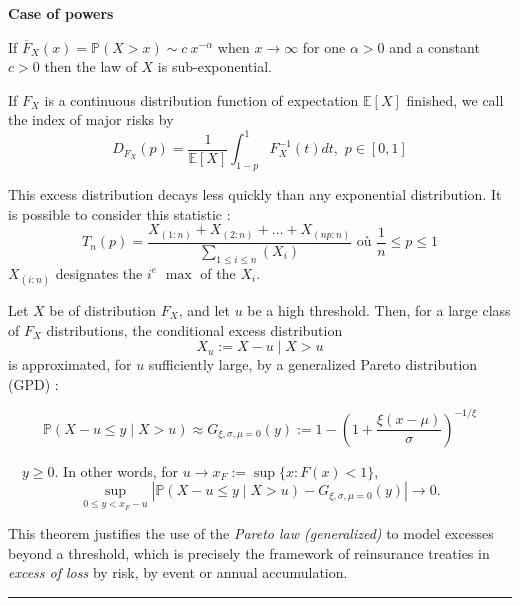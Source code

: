 \begin{f}
	
	\textbf{Case of powers} 
	
	If $\overline{F}_{X}(x)=\mathbb{P}(X > x)\sim c\ x^{-\alpha}$
		when $x \to \infty $ for one $\alpha > 0 $ and a constant $c > 0 $ then the law of $X$
		is sub-exponential.
	
		If $F_X$ is a continuous distribution function of expectation $\mathbb{E}[X]$ finished, we call the index of major risks by
		$$
		D_{F_X}(p)=\frac{1}{\mathbb{E}[X]}\int_{1-p}^{1} F_X^{-1}(t)dt,\, \, p\in [0,1]
		$$

	This excess distribution decays less quickly than any exponential distribution.
	It is possible to consider this statistic :
	$$
	T_n(p)=\frac{X_{(1:n)}+X_{(2:n)}+\ldots + X_{(np:n)}}{\sum_{1\leq i\leq n}(X_i)} \mbox{ où } \frac{1}{n}\leq p\leq 1
	$$
	$X_{(i:n)}$ designates the $i^e$ $\max $ of the $X_i$.

\end{f}
\begin{f}
	Let $X$ be of distribution $F_X$, and let $u$ be a high threshold. Then, for a large class of $F_X$ distributions, the conditional excess distribution
	\[
	X_u := X - u \mid X > u
	\]
	is approximated, for $u$ sufficiently large, by a generalized Pareto distribution (GPD) :
	
	\[
	\mathbb{P}(X - u \le y \mid X > u) \approx G_{\xi, \sigma, \mu=0}(y) :=  1 - \left(1+ \frac{\xi(x-\mu)}{\sigma}\right)^{-1/\xi} 
	\]
	
	$\quad y \ge 0$. In other words, for $u \to x_F := \sup\{x : F(x) < 1\}$,
	\[
	\sup_{0 \le y < x_F - u} \left| \mathbb{P}(X - u \le y \mid X > u) - G_{\xi,\sigma,\mu=0}(y) \right| \to 0.
	\]
	
	This theorem justifies the use of the \textit{Pareto law (generalized)} to model excesses beyond a threshold, which is precisely the framework of reinsurance treaties in \textit{excess of loss} by risk, by event or annual accumulation.
\end{f}
\hrule


